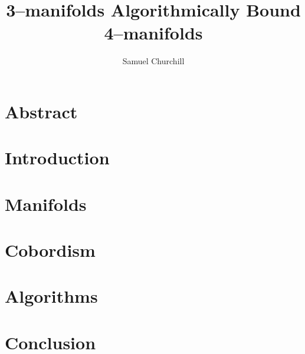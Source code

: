 \documentclass[12pt]{report}
\author{Samuel Churchill}
\title{3--manifolds Algorithmically Bound 4--manifolds}
\begin{document}
\maketitle

\chapter*{Abstract}

\tableofcontents
\listoffigures
\listofalgorithms


\chapter{Introduction}


\chapter{Manifolds}


\chapter{Cobordism}


\chapter{Algorithms}
\label{cha:algorithm}


\chapter{Conclusion}



%

{}

\end{document}
